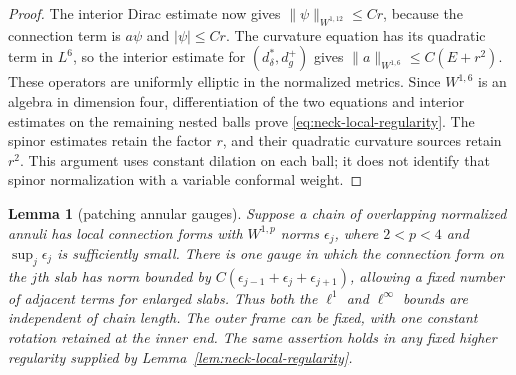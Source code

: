 \documentclass[11pt]{amsart}
\newtheorem{lemma}[theorem]{Lemma}
\theoremstyle{definition}
\theoremstyle{remark}
\theoremstyle{plain}
\begin{document}
\begin{proof}
The interior Dirac estimate now gives
$\|\psi\|_{W^{1,12}}\le Cr$, because the connection term is
$a\psi$ and $|\psi|\le Cr$.  The curvature equation has its
quadratic term in $L^6$, so the interior estimate for
$(d_\delta^*,d_g^+)$ gives
$\|a\|_{W^{1,6}}\le C(E+r^2)$.  These operators are uniformly
elliptic in the normalized metrics.  Since $W^{1,6}$ is an algebra
in dimension four, differentiation of the two equations and interior
estimates on the remaining nested balls prove
\eqref{eq:neck-local-regularity}.  The spinor estimates retain the
factor $r$, and their quadratic curvature sources retain $r^2$.
This argument uses constant dilation on each ball; it does not
identify that spinor normalization with a variable conformal weight.
\end{proof}

\begin{lemma}[patching annular gauges]\label{lem:annular-patching}
Suppose a chain of overlapping normalized annuli has local connection
forms with $W^{1,p}$ norms $\epsilon_j$, where $2<p<4$ and
$\sup_j\epsilon_j$ is sufficiently small.  There is one gauge in
which the connection form on the $j$th slab has norm bounded by
$C(\epsilon_{j-1}+\epsilon_j+\epsilon_{j+1})$, allowing a fixed
number of adjacent terms for enlarged slabs.  Thus both the
$\ell^1$ and $\ell^\infty$ bounds are independent of chain length.
The outer frame can be fixed, with one constant rotation retained
at the inner end.  The same assertion holds in any fixed higher
regularity supplied by Lemma~\ref{lem:neck-local-regularity}.
\end{lemma}
\end{document}
